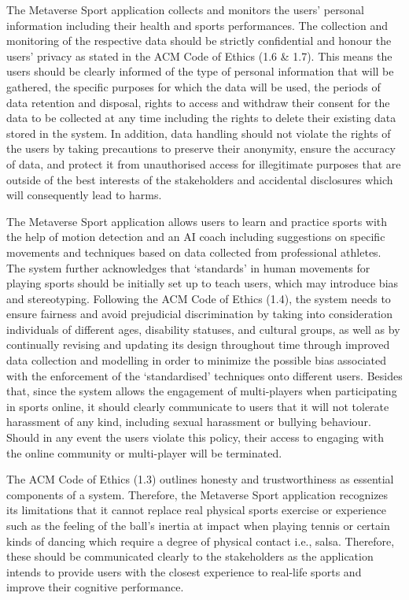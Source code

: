 \documentclass[a4paper]{article}
\begin{document}
	\par
	The Metaverse Sport application collects and monitors the users' personal information including their health and sports performances. The collection and monitoring of the respective data should be strictly confidential and honour the users' privacy as stated in the ACM Code of Ethics (1.6 \& 1.7)\cite{ref5}. This means the users should be clearly informed of the type of personal information that will be gathered, the specific purposes for which the data will be used, the periods of data retention and disposal, rights to access and withdraw their consent for the data to be collected at any time including the rights to delete their existing data stored in the system. In addition, data handling should not violate the rights of the users by taking precautions to preserve their anonymity, ensure the accuracy of data, and protect it from unauthorised access for illegitimate purposes that are outside of the best interests of the stakeholders and accidental disclosures which will consequently lead to harms.
	
	\par
	The Metaverse Sport application allows users to learn and practice sports with the help of motion detection and an AI coach including suggestions on specific movements and techniques based on data collected from professional athletes. The system further acknowledges that `standards' in human movements for playing sports should be initially set up to teach users, which may introduce bias and stereotyping. Following the ACM Code of Ethics (1.4)\cite{ref5}, the system needs to ensure fairness and avoid prejudicial discrimination by taking into consideration individuals of different ages, disability statuses, and cultural groups, as well as by continually revising and updating its design throughout time through improved data collection and modelling in order to minimize the possible bias associated with the enforcement of the `standardised' techniques onto different users. Besides that, since the system allows the engagement of multi-players when participating in sports online, it should clearly communicate to users that it will not tolerate harassment of any kind, including sexual harassment or bullying behaviour. Should in any event the users violate this policy, their access to engaging with the online community or multi-player will be terminated.

	\par
	The ACM Code of Ethics (1.3)\cite{ref5} outlines honesty and trustworthiness as essential components of a system. Therefore, the Metaverse Sport application recognizes its limitations that it cannot replace real physical sports exercise or experience such as the feeling of the ball's inertia at impact when playing tennis or certain kinds of dancing which require a degree of physical contact i.e., salsa. Therefore, these should be communicated clearly to the stakeholders as the application intends to provide users with the closest experience to real-life sports and improve their cognitive performance.
\end{document}
